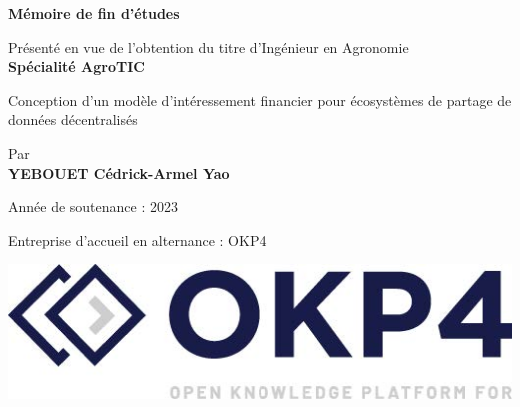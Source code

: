 \begin{titlepage}
\begin{center}
        \vspace{2.5cm}
        
        \textbf{\LARGE Mémoire de fin d'études}

        \vspace{.7cm}
        {Présenté en vue de l'obtention du titre d'Ingénieur en Agronomie}\\
        \vspace{.7cm}
        \textbf{Spécialité AgroTIC}
        
        \vspace{2.5cm}
        
        {\Large Conception d'un modèle d'intéressement financier pour écosystèmes de partage de données décentralisés}
        
        \vspace{2cm}
        
        Par\\
        \vspace{.3cm}
        {\textbf{YEBOUET Cédrick-Armel Yao}}
        
        \vspace{0.5cm}
        {Année de soutenance : 2023}
        
        
        
        \vspace{2cm}
        
        \begin{minipage}[t]{1\textwidth}
            \begin{minipage}[t]{0.5\textwidth}
                Entreprise d'accueil en alternance : OKP4
            \end{minipage}
            \hfill
            \begin{minipage}[t]{0.3\textwidth}
                \includegraphics[width=\textwidth]{ILLUSTRATIONS/logo_okp4.jpg}
            \end{minipage}                           
        \end{minipage}
    \end{center}
\end{titlepage}
